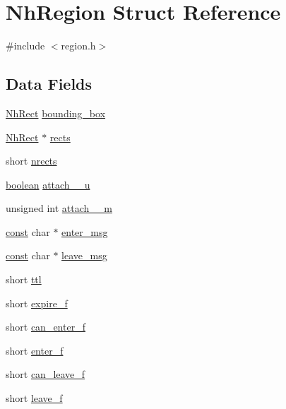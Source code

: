 \hypertarget{structNhRegion}{\section{Nh\+Region Struct Reference}
\label{structNhRegion}
}


{\ttfamily \#include $<$region.\+h$>$}

\subsection*{Data Fields}
\begin{DoxyCompactItemize}
\item 
\hyperlink{rect_8h_ace177dfae9a298f345a8d92a8295e55a}{Nh\+Rect} \hyperlink{structNhRegion_a81d129b9fa7d98ab862162b7d5ea0e4d}{bounding\+\_\+box}
\item 
\hyperlink{rect_8h_ace177dfae9a298f345a8d92a8295e55a}{Nh\+Rect} $\ast$ \hyperlink{structNhRegion_a9f1ce44843237df70ccb94ace5c3d06c}{rects}
\item 
short \hyperlink{structNhRegion_a0dd5ab591144d5c85049f3d498191dff}{nrects}
\item 
\hyperlink{global_8h_a531b10dd351aa162d7dcccd1966308b8}{boolean} \hyperlink{structNhRegion_a21f1c70cde4b7c95d16fc3e452bf1c91}{attach\+\_\+\_\+u}
\item 
unsigned int \hyperlink{structNhRegion_adefa5343cc4f6d9763f0a3a0038f22ca}{attach\+\_\+\_\+m}
\item 
\hyperlink{tradstdc_8h_a2c212835823e3c54a8ab6d95c652660e}{const} char $\ast$ \hyperlink{structNhRegion_ab95bd75bd12288706dce7a9364acc8c7}{enter\+\_\+msg}
\item 
\hyperlink{tradstdc_8h_a2c212835823e3c54a8ab6d95c652660e}{const} char $\ast$ \hyperlink{structNhRegion_abfaffe94b8e6f57d98abcb7e28d3bcb2}{leave\+\_\+msg}
\item 
short \hyperlink{structNhRegion_aea256aee0ffc4bb6c00199405cf0c775}{ttl}
\item 
short \hyperlink{structNhRegion_ac62d1d5bbe2c6f51caea6b2771db200d}{expire\+\_\+f}
\item 
short \hyperlink{structNhRegion_a6ecb97e787cdcba6d6142ebe85192363}{can\+\_\+enter\+\_\+f}
\item 
short \hyperlink{structNhRegion_af9c79c43c68e34c27d7e5554abd05196}{enter\+\_\+f}
\item 
short \hyperlink{structNhRegion_aa7d11bf485e368b5a7a0ab0334c8861c}{can\+\_\+leave\+\_\+f}
\item 
short \hyperlink{structNhRegion_a667a81429ee1a23dbfc219c410706a48}{leave\+\_\+f}

\end{DoxyCompactItemize}
